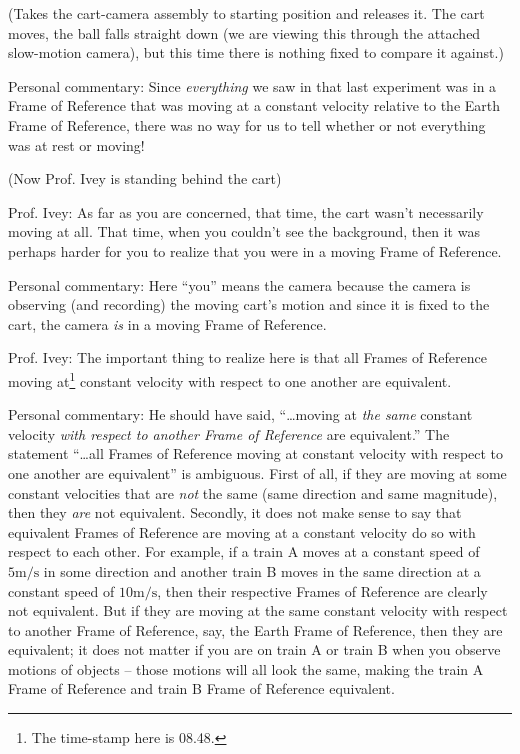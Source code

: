 \documentclass[a6paper]{article}
\newcommand{\perscom}[1]{
    {\footnotesize Personal commentary:  #1}
}
\begin{document}
(Takes the cart-camera assembly to starting position and releases it. The cart moves, the ball falls straight down (we are viewing this through the attached slow-motion camera), but this time there is nothing fixed to compare it against.)

\perscom{ Since \emph{everything} we saw in that last experiment was in a Frame of Reference that was moving at a constant velocity relative to the Earth Frame of Reference, there was no way for us to tell whether or not everything was at rest or moving!}

(Now Prof. Ivey is standing behind the cart)

Prof. Ivey: As far as you are concerned, that time, the cart wasn't necessarily moving at all. That time, when you couldn't see the background, then it was perhaps harder for you to realize that you were in a moving Frame of Reference. 

\perscom{ Here ``you'' means the camera because the camera is observing (and recording) the moving cart's motion and since it is fixed to the cart, the camera \emph{is} in a moving Frame of Reference.}

Prof. Ivey: The important thing to realize here is that all Frames of Reference moving at\footnote{The time-stamp here is 08.48.} constant velocity with respect to one another are equivalent.

\perscom{ He should have said, ``\dots moving at \emph{the same} constant velocity \emph{with respect to another Frame of Reference} are equivalent.'' The statement ``\dots all Frames of Reference moving at constant velocity with respect to one another are equivalent'' is ambiguous. First of all, if they are moving at some constant velocities that are \emph{not} the same (same direction and same magnitude), then they \emph{are} not equivalent. Secondly, it does not make sense to say that equivalent Frames of Reference are moving at a constant velocity do so with respect to each other. For example, if a train A moves at a constant speed of $5\si{\m\per\s}$ in some direction and another train B moves in the same direction at a constant speed of $10\si{\m\per\s}$, then their respective Frames of Reference are clearly not equivalent. But if they are moving at the same constant velocity with respect to another Frame of Reference, say, the Earth Frame of Reference, then they are equivalent; it does not matter if you are on train A or train B when you observe motions of objects -- those motions will all look the same, making the train A Frame of Reference and train B Frame of Reference equivalent.}
\end{document}
